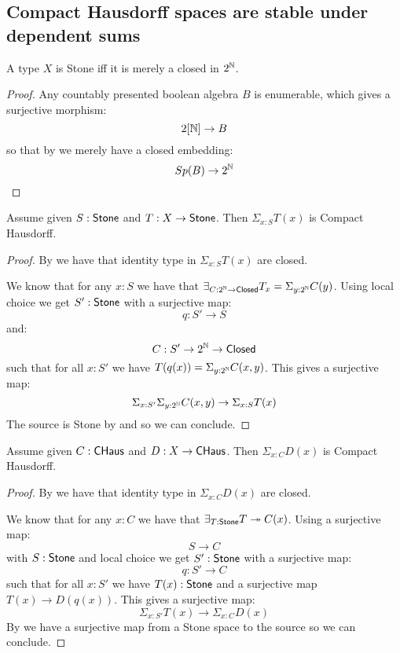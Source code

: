 \subsection{Compact Hausdorff spaces are stable under dependent sums}

\begin{lemma}
A type $X$ is Stone iff it is merely a closed in $2^{\mathbb{N}}$.
\end{lemma}

\begin{proof}
Any countably presented boolean algebra $B$ is enumerable, which gives a surjective morphism:
$$ 2[\mathbb{N}]\to B$$
so that by  we merely have a closed embedding:
$$ Sp(B)\to 2^{\mathbb{N}}$$
\end{proof}

\begin{lemma}\label{SigmaStoneCompactHausdorff}
Assume given $S:\mathsf{Stone}$ and $T:X\to \mathsf{Stone}$. Then $\Sigma_{x:S}T(x)$ is Compact Hausdorff.
\end{lemma}

\begin{proof}
By  we have that identity type in $\Sigma_{x:S}T(x)$ are closed.

We know that for any $x:S$ we have that $\exists_{C:2^{\mathbb{N}}\to \mathsf{Closed}} T_x = \Sigma_{y:2^{\mathbb{N}}}C(y)$. Using local choice we get $S':\mathsf{Stone}$ with a surjective map:
$$q:S'\to S$$
and:
$$ C : S'\to 2^{\mathbb{N}}\to\mathsf{Closed}$$
such that for all $x:S'$ we have $T(q(x)) = \Sigma_{y:2^{\mathbb{N}}}C(x,y)$. This gives a surjective map:
$$ \Sigma_{x:S'}\Sigma_{y:2^{\mathbb{N}}} C(x,y)\to \Sigma_{x:S}T(x)$$
The source is Stone by  and  so we can conclude.
\end{proof}

\begin{lemma}
Assume given $C:\mathsf{CHaus}$ and $D:X\to \mathsf{CHaus}$. Then $\Sigma_{x:C}D(x)$ is Compact Hausdorff.
\end{lemma}

\begin{proof}
By  we have that identity type in $\Sigma_{x:C}D(x)$ are closed.

We know that for any $x:C$ we have that $\exists_{T:\mathsf{Stone}} T\twoheadrightarrow C(x)$. Using a surjective map:
$$ S\to C$$
with $S:\mathsf{Stone}$ and local choice we get $S':\mathsf{Stone}$ with a surjective map:
$$q:S'\to C$$
such that for all $x:S'$ we have $T(x):\mathsf{Stone}$ and a surjective map $T(x)\to D(q(x))$. This gives a surjective map:
$$ \Sigma_{x:S'}T(x)\to \Sigma_{x:C}D(x)$$
By  we have a surjective map from a Stone space to the source so we can conclude.
\end{proof}
